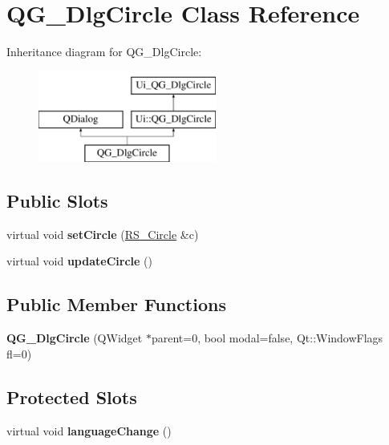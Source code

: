 \hypertarget{classQG__DlgCircle}{\section{Q\-G\-\_\-\-Dlg\-Circle Class Reference}
\label{classQG__DlgCircle}
}
Inheritance diagram for Q\-G\-\_\-\-Dlg\-Circle\-:\begin{figure}[H]
\begin{center}
\leavevmode
\includegraphics[height=3.000000cm]{classQG__DlgCircle}
\end{center}
\end{figure}
\subsection*{Public Slots}
\begin{DoxyCompactItemize}
\item 
\hypertarget{classQG__DlgCircle_a8e389d2dc0318f6c46ee94d485f34a8c}{virtual void {\bfseries set\-Circle} (\hyperlink{classRS__Circle}{R\-S\-\_\-\-Circle} \&c)}\label{classQG__DlgCircle_a8e389d2dc0318f6c46ee94d485f34a8c}

\item 
\hypertarget{classQG__DlgCircle_a81596f772ec05264c20e58556e9c5ce5}{virtual void {\bfseries update\-Circle} ()}\label{classQG__DlgCircle_a81596f772ec05264c20e58556e9c5ce5}

\end{DoxyCompactItemize}
\subsection*{Public Member Functions}
\begin{DoxyCompactItemize}
\item 
\hypertarget{classQG__DlgCircle_af4636f80b8f957f1c2b378d3c37dcf9f}{{\bfseries Q\-G\-\_\-\-Dlg\-Circle} (Q\-Widget $\ast$parent=0, bool modal=false, Qt\-::\-Window\-Flags fl=0)}\label{classQG__DlgCircle_af4636f80b8f957f1c2b378d3c37dcf9f}

\end{DoxyCompactItemize}
\subsection*{Protected Slots}
\begin{DoxyCompactItemize}
\item 
\hypertarget{classQG__DlgCircle_a86be517ea1b24c2554a34e33ce0aaf24}{virtual void {\bfseries language\-Change} ()}\label{classQG__DlgCircle_a86be517ea1b24c2554a34e33ce0aaf24}

\end{DoxyCompactItemize}
